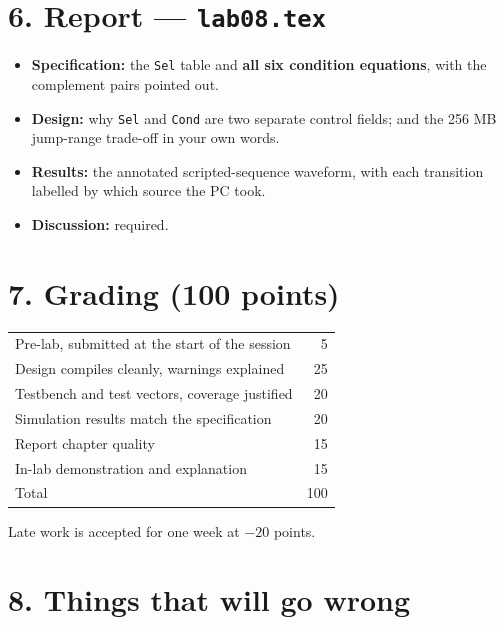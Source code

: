 \documentclass[11pt]{article}
\newcommand{\code}[1]{\texttt{#1}}
\begin{document}
\section*{6. Report --- \code{lab08.tex}}

\begin{itemize}[leftmargin=1.6em,itemsep=1pt]
\item \textbf{Specification:} the \code{Sel} table and \textbf{all six condition
equations}, with the complement pairs pointed out.
\item \textbf{Design:} why \code{Sel} and \code{Cond} are two separate control
fields; and the 256 MB jump-range trade-off in your own words.
\item \textbf{Results:} the annotated scripted-sequence waveform, with each
transition labelled by which source the PC took.
\item \textbf{Discussion:} required.
\end{itemize}

\section*{7. Grading (100 points)}

\begin{center}
\begin{tabular}{lr}
\toprule
Pre-lab, submitted at the start of the session & 5 \\
Design compiles cleanly, warnings explained & 25 \\
Testbench and test vectors, coverage justified & 20 \\
Simulation results match the specification & 20 \\
Report chapter quality & 15 \\
In-lab demonstration and explanation & 15 \\
\midrule
Total & 100 \\
\bottomrule
\end{tabular}
\end{center}

Late work is accepted for one week at $-20$ points.

\section*{8. Things that will go wrong}
\end{document}
